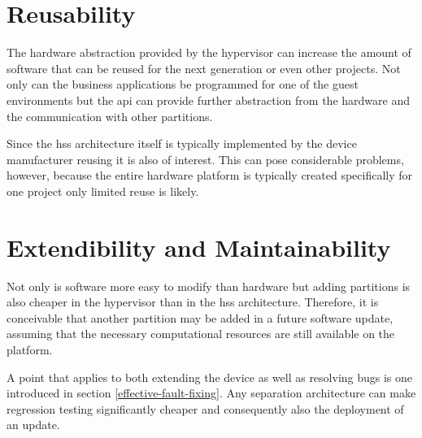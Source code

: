 

\section{Reusability}
The hardware abstraction provided by the hypervisor can increase the amount of software that can be reused for the next generation or even other projects. Not only can the business applications be programmed for one of the guest environments but the \acrshort{api} can provide further abstraction from the hardware and the communication with other partitions.

Since the \acrshort{hss} architecture itself is typically implemented by the device manufacturer reusing it is also of interest. This can pose considerable problems, however, because the entire hardware platform is typically created specifically for one project only limited reuse is likely.


\section{Extendibility and Maintainability}
Not only is software more easy to modify than hardware but adding partitions is also cheaper in the hypervisor than in the \acrshort{hss} architecture. Therefore, it is conceivable that another partition may be added in a future software update, assuming that the necessary computational resources are still available on the platform. 

A point that applies to both extending the device as well as resolving bugs is one introduced in section \ref{effective-fault-fixing}. Any separation architecture can make regression testing significantly cheaper and consequently also the deployment of an update. 


